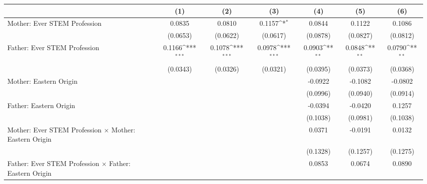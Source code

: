 {
\def\sym#1{\ifmmode^{#1}\else\(^{#1}\)\fi}
\begin{tabular}{l*{6}{c}}
\toprule
                    &\multicolumn{1}{c}{(1)}         &\multicolumn{1}{c}{(2)}         &\multicolumn{1}{c}{(3)}         &\multicolumn{1}{c}{(4)}         &\multicolumn{1}{c}{(5)}         &\multicolumn{1}{c}{(6)}         \\
\midrule
Mother: Ever STEM Profession&      0.0835         &      0.0810         &      0.1157\sym{*}  &      0.0844         &      0.1122         &      0.1086         \\
                    &    (0.0653)         &    (0.0622)         &    (0.0617)         &    (0.0878)         &    (0.0827)         &    (0.0812)         \\
\addlinespace
Father: Ever STEM Profession&      0.1166\sym{***}&      0.1078\sym{***}&      0.0978\sym{***}&      0.0903\sym{**} &      0.0848\sym{**} &      0.0790\sym{**} \\
                    &    (0.0343)         &    (0.0326)         &    (0.0321)         &    (0.0395)         &    (0.0373)         &    (0.0368)         \\
\addlinespace
Mother: Eastern Origin&                     &                     &                     &     -0.0922         &     -0.1082         &     -0.0802         \\
                    &                     &                     &                     &    (0.0996)         &    (0.0940)         &    (0.0914)         \\
\addlinespace
Father: Eastern Origin&                     &                     &                     &     -0.0394         &     -0.0420         &      0.1257         \\
                    &                     &                     &                     &    (0.1038)         &    (0.0981)         &    (0.1038)         \\
\addlinespace
Mother: Ever STEM Profession $\times$ Mother: Eastern Origin&                     &                     &                     &      0.0371         &     -0.0191         &      0.0132         \\
                    &                     &                     &                     &    (0.1328)         &    (0.1257)         &    (0.1275)         \\
\addlinespace
Father: Ever STEM Profession $\times$ Father: Eastern Origin&                     &                     &                     &      0.0853         &      0.0674         &      0.0890         \\

\end{tabular}}
